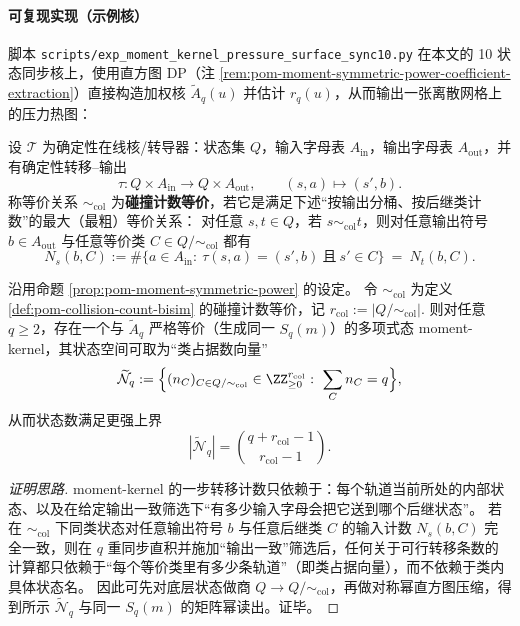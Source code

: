 \paragraph{可复现实现（示例核）}
脚本 \texttt{scripts/exp\_moment\_kernel\_pressure\_surface\_sync10.py} 在本文的 10 状态同步核上，使用直方图 DP（注 \ref{rem:pom-moment-symmetric-power-coefficient-extraction}）直接构造加权核 \(\widetilde A_q(u)\) 并估计 \(r_q(u)\)，从而输出一张离散网格上的压力热图：


\begin{definition}\label{def:pom-collision-count-bisim}
设 \(\mathcal{T}\) 为确定性在线核/转导器：状态集 \(Q\)，输入字母表 \(A_{\mathrm{in}}\)，输出字母表 \(A_{\mathrm{out}}\)，并有确定性转移--输出
\[
\tau:Q\times A_{\mathrm{in}}\to Q\times A_{\mathrm{out}},\qquad (s,a)\mapsto (s',b).
\]
称等价关系 \(\sim_{\mathrm{col}}\) 为\textbf{碰撞计数等价}，若它是满足下述“按输出分桶、按后继类计数”的最大（最粗）等价关系：
对任意 \(s,t\in Q\)，若 \(s\sim_{\mathrm{col}} t\)，则对任意输出符号 \(b\in A_{\mathrm{out}}\) 与任意等价类 \(C\in Q/{\sim_{\mathrm{col}}}\) 都有
\[
N_{s}(b,C):=\#\{a\in A_{\mathrm{in}}:\ \tau(s,a)=(s',b)\ \text{且}\ s'\in C\}
\ =\
N_{t}(b,C).
\]
\end{definition}

\begin{proposition}[对称幂之前的预压缩：用 \texorpdfstring{$r_{\mathrm{col}}=|Q/{\sim_{\mathrm{col}}}|$}{rcol} 替代 \texorpdfstring{$|Q|$}{|Q|}]\label{prop:pom-moment-col-lumping}
\leanverified{paper\_pom\_moment\_col\_lumping}
沿用命题 \ref{prop:pom-moment-symmetric-power} 的设定。
令 \(\sim_{\mathrm{col}}\) 为定义 \ref{def:pom-collision-count-bisim} 的碰撞计数等价，记
\(
r_{\mathrm{col}}:=|Q/{\sim_{\mathrm{col}}}|.
\)
则对任意 \(q\ge 2\)，存在一个与 \(\widetilde A_q\) 严格等价（生成同一 \(S_q(m)\)）的多项式态 moment-kernel，其状态空间可取为“类占据数向量”
\[
\widetilde{\mathcal{N}}_{q}:=\Bigl\{(n_{C})_{C\in Q/{\sim_{\mathrm{col}}}}\in\ZZ_{\ge 0}^{r_{\mathrm{col}}}:\ \sum_{C}n_{C}=q\Bigr\},
\]
从而状态数满足更强上界
\[
|\widetilde{\mathcal{N}}_q|=\binom{q+r_{\mathrm{col}}-1}{r_{\mathrm{col}}-1}.
\]
\end{proposition}

\begin{proof}[证明思路]
moment-kernel 的一步转移计数只依赖于：每个轨道当前所处的内部状态、以及在给定输出一致筛选下“有多少输入字母会把它送到哪个后继状态”。
若在 \(\sim_{\mathrm{col}}\) 下同类状态对任意输出符号 \(b\) 与任意后继类 \(C\) 的输入计数 \(N_s(b,C)\) 完全一致，则在 \(q\) 重同步直积并施加“输出一致”筛选后，任何关于可行转移条数的计算都只依赖于“每个等价类里有多少条轨道”（即类占据向量），而不依赖于类内具体状态名。
因此可先对底层状态做商 \(Q\to Q/{\sim_{\mathrm{col}}}\)，再做对称幂直方图压缩，得到所示 \(\widetilde{\mathcal{N}}_q\) 与同一 \(S_q(m)\) 的矩阵幂读出。证毕。
\end{proof}

